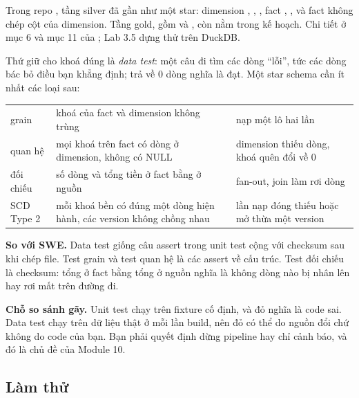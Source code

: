 Trong repo , tầng silver  đã gần như một star: dimension , , , fact , , và fact không chép cột của dimension. Tầng gold, gồm  và , còn nằm trong kế hoạch. Chi tiết ở mục 6 và mục 11 của ; Lab 3.5 dựng thử  trên DuckDB.

Thứ giữ cho khoá đúng là \textit{data test}: một câu  đi tìm các dòng ``lỗi'', tức các dòng bác bỏ điều bạn khẳng định; trả về 0 dòng nghĩa là đạt. Một star schema cần ít nhất các loại sau:

\begin{xltabular}{\textwidth}{@{}P{2.4cm} L L@{}}
\toprule
{} &  &  \\
\midrule
\endhead
\bottomrule
\endfoot
grain & khoá của fact và dimension không trùng & nạp một lô hai lần \\
quan hệ & mọi khoá trên fact có dòng ở dimension, không có NULL & dimension thiếu dòng, khoá quên đổi về 0 \\
đối chiếu & số dòng và tổng tiền ở fact bằng ở nguồn & fan-out, join làm rơi dòng \\
SCD Type 2 & mỗi khoá bền có đúng một dòng hiện hành, các version không chồng nhau & lần nạp đóng thiếu hoặc mở thừa một version \\
\end{xltabular}

\begin{ghichu}
\textbf{So với SWE.} Data test giống câu assert trong unit test cộng với checksum sau khi chép file. Test grain và test quan hệ là các assert về cấu trúc. Test đối chiếu là checksum: tổng  ở fact bằng tổng ở nguồn nghĩa là không dòng nào bị nhân lên hay rơi mất trên đường đi.

\textbf{Chỗ so sánh gãy.} Unit test chạy trên fixture cố định, và đỏ nghĩa là code sai. Data test chạy trên dữ liệu thật ở mỗi lần build, nên đỏ có thể do nguồn đổi chứ không do code của bạn. Bạn phải quyết định dừng pipeline hay chỉ cảnh báo, và đó là chủ đề của Module 10.
\end{ghichu}

\subsection{Làm thử}

